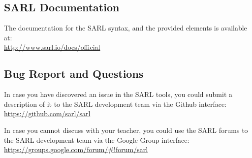 \subsection{SARL Documentation}

The documentation for the SARL syntax, and the provided elements is available at:\\
\url{http://www.sarl.io/docs/official}

\subsection{Bug Report and Questions}

In case you have discovered an issue in the SARL tools, you could submit a description of it to the SARL development team via the Github interface:\\
\url{https://github.com/sarl/sarl}

In case you cannot discuss with your teacher, you could use the SARL forums to the SARL development team via the Google Group interface:\\
\url{https://groups.google.com/forum/#!forum/sarl}

